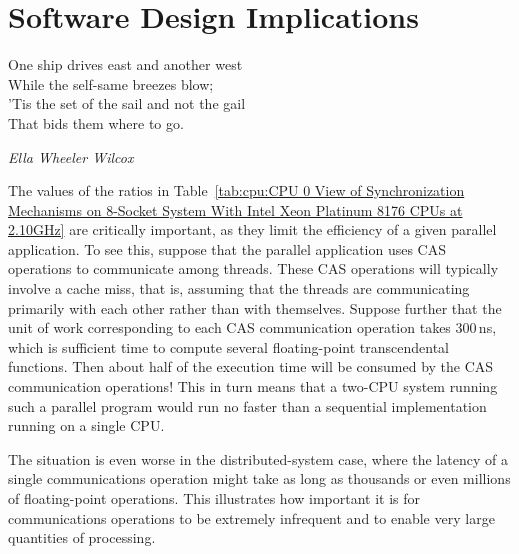 
\section{Software Design Implications}
\label{sec:cpu:Software Design Implications}
%
\epigraph{One ship drives east and another west \\
	  While the self-same breezes blow; \\
	  'Tis the set of the sail and not the gail \\
	  That bids them where to go.}
	 {\emph{Ella Wheeler Wilcox}}

The values of the ratios in
Table~\ref{tab:cpu:CPU 0 View of Synchronization Mechanisms on 8-Socket System With Intel Xeon Platinum 8176 CPUs at 2.10GHz}
are critically important, as they limit the
efficiency of a given parallel application.
To see this, suppose that the parallel application uses CAS
operations to communicate among threads.
These CAS operations will typically involve a cache miss, that is, assuming
that the threads are communicating primarily with each other rather than
with themselves.
Suppose further that the unit of work corresponding to each CAS communication
operation takes 300\,ns, which is sufficient time to compute several
floating-point transcendental functions.
Then about half of the execution time will be consumed by the CAS
communication operations!
This in turn means that a two-CPU system running such a parallel program
would run no faster than a sequential implementation running on a
single CPU.

The situation is even worse in the distributed-system case, where the
latency of a single communications operation might take as long as
thousands or even millions of floating-point operations.
This illustrates how important it is for communications operations to
be extremely infrequent and to enable very large quantities of processing.

